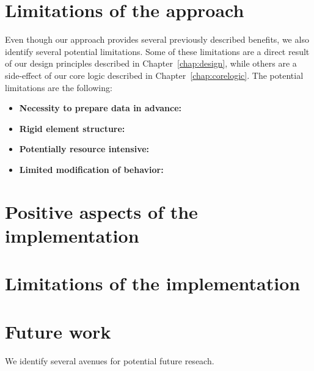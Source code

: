 \section{Limitations of the approach}
Even though our approach provides several previously described benefits, we also identify several potential limitations.
Some of these limitations are a direct result of our design principles described in Chapter~\ref{chap:design}, while others are
a side-effect of our core logic described in Chapter~\ref{chap:corelogic}.
The potential limitations are the following:
\begin{itemize}
	\item \textbf{Necessity to prepare data in advance:}
	\item \textbf{Rigid element structure:}
	\item \textbf{Potentially resource intensive:}
	\item \textbf{Limited modification of behavior:}
\end{itemize}

\section{Positive aspects of the implementation}
\section{Limitations of the implementation}

\section{Future work}

We identify several avenues for potential future reseach.
